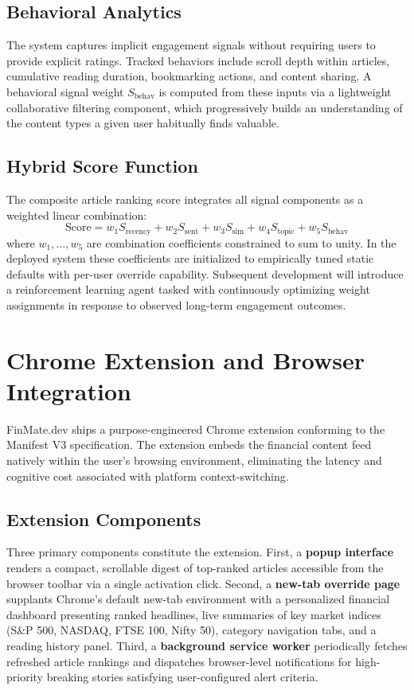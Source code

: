 \documentclass[conference]{IEEEtran}
\begin{document}
\subsection{Behavioral Analytics}
The system captures implicit engagement signals without requiring users to provide explicit ratings. Tracked behaviors include scroll depth within articles, cumulative reading duration, bookmarking actions, and content sharing. A behavioral signal weight $S_{\text{behav}}$ is computed from these inputs via a lightweight collaborative filtering component, which progressively builds an understanding of the content types a given user habitually finds valuable.

\subsection{Hybrid Score Function}
The composite article ranking score integrates all signal components as a weighted linear combination:
\begin{equation}
\text{Score} = w_1 S_{\text{recency}} + w_2 S_{\text{sent}} + w_3 S_{\text{sim}} + w_4 S_{\text{topic}} + w_5 S_{\text{behav}}
\end{equation}
where $w_1, \ldots, w_5$ are combination coefficients constrained to sum to unity. In the deployed system these coefficients are initialized to empirically tuned static defaults with per-user override capability. Subsequent development will introduce a reinforcement learning agent tasked with continuously optimizing weight assignments in response to observed long-term engagement outcomes.

\section{Chrome Extension and Browser Integration}

FinMate.dev ships a purpose-engineered Chrome extension conforming to the Manifest V3 specification. The extension embeds the financial content feed natively within the user's browsing environment, eliminating the latency and cognitive cost associated with platform context-switching.

\subsection{Extension Components}
Three primary components constitute the extension. First, a \textbf{popup interface} renders a compact, scrollable digest of top-ranked articles accessible from the browser toolbar via a single activation click. Second, a \textbf{new-tab override page} supplants Chrome's default new-tab environment with a personalized financial dashboard presenting ranked headlines, live summaries of key market indices (S\&P 500, NASDAQ, FTSE 100, Nifty 50), category navigation tabs, and a reading history panel. Third, a \textbf{background service worker} periodically fetches refreshed article rankings and dispatches browser-level notifications for high-priority breaking stories satisfying user-configured alert criteria.
\end{document}
